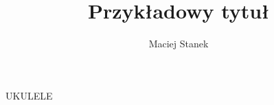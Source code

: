 \documentclass[twoside]{article}
\author{Maciej Stanek}
\title{Przykładowy tytuł}
\begin{document}

UKULELE
\end{document}
